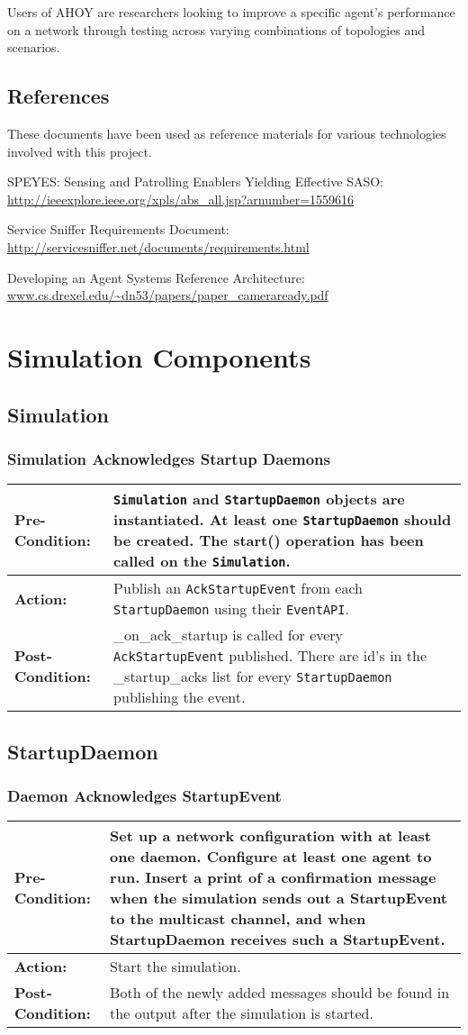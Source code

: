 \documentclass[titlepage]{article}
\renewenvironment{itemize*}
    {\begin{itemize}
        \setlength{\itemsep}{0pt}%
        \setlength{\parskip}{0pt}%
        \setlength{\partopsep}{0pt}%
        \setlength{\topsep}{0pt}}%
    {\end{itemize}}
\newcommand{\testcase}[3]{
    \begin{center}
    \begin{tabular}{| l | p{0.7\textwidth}|}
        \hline
        \rowcolor[gray]{0.8}\textbf{Pre-Condition:} & #1 \\ \hline
        \textbf{Action:} & #2 \\ \hline
        \rowcolor[gray]{0.8}\textbf{Post-Condition:} & #3 \\ \hline
    \end{tabular}
    \end{center}
}
\begin{document}
Users of AHOY are researchers looking to improve a specific agent's performance on a network through testing across varying combinations of topologies and scenarios.

\subsection{References%
  \label{references}%
}

These documents have been used as reference materials for various technologies involved with this project.
%
\begin{itemize*}
	\item SPEYES: Sensing and Patrolling Enablers Yielding Effective SASO: \url{http://ieeexplore.ieee.org/xpls/abs\_all.jsp?arnumber=1559616}
	\item Service Sniffer Requirements Document: \url{http://servicesniffer.net/documents/requirements.html}
    \item Developing an Agent Systems Reference Architecture: \url{www.cs.drexel.edu/~dn53/papers/paper\_cameraready.pdf}
\end{itemize*}

\section{Simulation Components}
\subsection{Simulation}

\subsubsection{Simulation Acknowledges Startup Daemons}

\testcase{\texttt{Simulation} and \texttt{StartupDaemon} objects are instantiated. At least one \texttt{StartupDaemon} should be created. The start() operation has been called on the \texttt{Simulation}. }{Publish an \texttt{AckStartupEvent} from each \texttt{StartupDaemon} using their \texttt{EventAPI}.}{\_on\_ack\_startup is called for every \texttt{AckStartupEvent} published.  There are id's in the \_startup\_acks list for every \texttt{StartupDaemon} publishing the event.}

\subsection{StartupDaemon}
\subsubsection{Daemon Acknowledges StartupEvent}
\testcase{Set up a network configuration with at least one daemon.  Configure at least one agent to run.  Insert a print of a confirmation message when the simulation sends out a StartupEvent to the multicast channel, and when StartupDaemon receives such a StartupEvent.}{Start the simulation.}{Both of the newly added messages should be found in the output after the simulation is started.}
\end{document}

